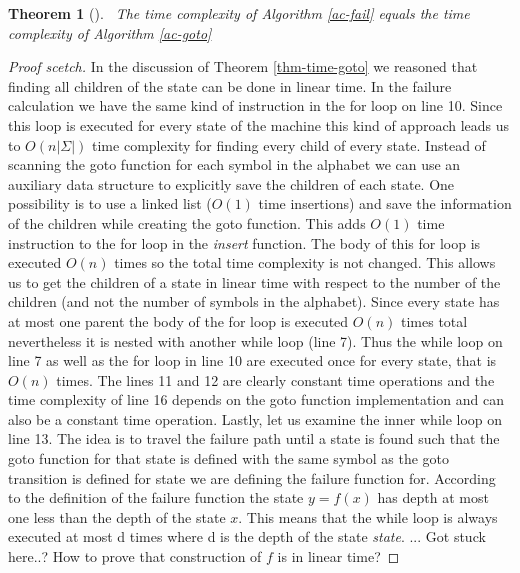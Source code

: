 \documentclass[english,twoside,censored,csm,algorithms-track-2020]{HYthesisML}
\theoremstyle{plain}
\newtheorem{theorem}{Theorem}[chapter]
\theoremstyle{definition}
\begin{document}
\begin{theorem}[]~\label{thm-time-failure}
    The time complexity of Algorithm \ref{ac-fail} equals the time complexity of
  Algorithm \ref{ac-goto}
\end{theorem}
\begin{proof}[Proof scetch]
In the discussion of Theorem
\ref{thm-time-goto} we reasoned that finding all children of the state can be done in
linear time. In the failure calculation we have the same kind of instruction in the for loop
on line 10. Since this loop is executed for every state of the machine this kind of approach leads
us to $O(n|\Sigma|)$ time complexity for finding every child of every state. Instead of scanning
the goto function for each symbol in the alphabet we can use an auxiliary data structure to
explicitly save the children of each state. One possibility is to use a linked list ($O(1)$ time
insertions) and save the information of the children while creating the goto function. This adds
$O(1)$ time instruction to the for loop in the \textit{insert} function. The body of this for loop
is executed $O(n)$ times so the total time complexity is not changed. This allows us to get the
children of a state in linear time with respect to the number of the children (and not the number of
symbols in the alphabet). Since every state
has at most one parent the body of the for loop is executed $O(n)$ times total nevertheless it
is nested with another while loop (line 7). Thus the while loop on line 7 as well as the for loop in
line 10 are executed once for every state, that is $O(n)$ times. The lines 11 and 12 are clearly constant
time operations and the time complexity of line 16 depends on the goto function implementation and
can also be a constant time operation. Lastly, let us examine the inner while loop on line 13.
The idea is to travel the failure path until a state is found such that the goto function
for that state is defined with the same symbol as the goto transition is defined for state we are
defining the failure function for. According to the definition of the failure function the state
$y=f(x)$ has depth at most one less than the depth of the state $x$. This means that the while
loop is always executed at most d times where d is the depth of the state \textit{state}.
... Got stuck here..? How to prove that construction of $f$ is in linear time?

\end{proof}

\end{document}

